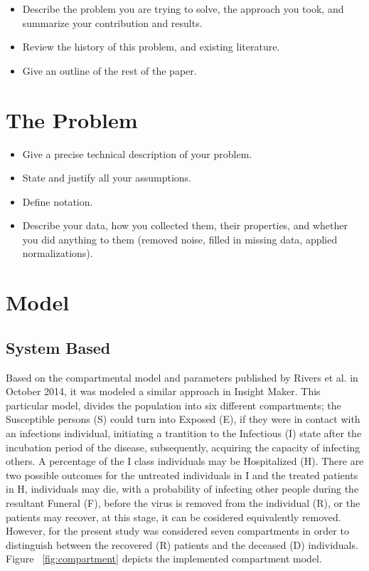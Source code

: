 \documentclass[10pt]{article}
\begin{document}
\begin{itemize}
\item Describe the problem you are trying to solve, the approach
you took, and summarize your contribution and results.

\item Review the history of this problem, and existing literature.

\item Give an outline of the rest of the paper.
\end{itemize}

\section{The Problem}
\begin{itemize}
\item Give a precise technical description of your problem. 

\item State and justify all your assumptions. 

\item Define notation. 

\item Describe your data, how you collected them, their properties,
and whether you did 
anything to them (removed noise, filled in missing data, 
applied normalizations).
\end{itemize}
%
%
%
%
%
%
%
%
%

\section{Model}\label{sec:Model}
%
%
\subsection{System Based}
Based on the compartmental model and parameters published by Rivers et al.\cite{Rivers2014} in October 2014, it was modeled a similar approach in Insight Maker.  This particular model, divides the population into six different compartments; the Susceptible persons (S) could turn into Exposed (E), if they were in contact with an infections individual, initiating a trantition to the Infectious (I) state after the incubation period of the disease, subsequently, acquiring the capacity of infecting others. A percentage of the I class individuals may be Hospitalized (H). There are two possible outcomes for the untreated individuals in I and the treated patients in H, individuals may die, with a probability of infecting other people during the resultant Funeral (F), before the virus is removed from the individual (R), or the patients may recover, at this stage, it can be cosidered equivalently removed. However, for the present study was considered seven compartments in order to distinguish between the recovered (R) patients and the deceased (D) individuals. Figure ~\ref{fig:compartment} depicts the implemented compartment model. \\
\end{document}
